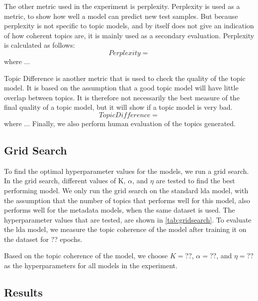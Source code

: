 The other metric used in the experiment is perplexity.
Perplexity is used as a metric, to show how well a model can predict new test samples.
But because perplexity is not specific to topic models, and by itself does not give an indication of how coherent topics are, it is mainly used as a secondary evaluation.
Perplexity is calculated as follows:
\begin{equation}
	Perplexity = 
\end{equation}
\noindent where ...

Topic Difference is another metric that is used to check the quality of the topic model.
It is based on the assumption that a good topic model will have little overlap between topics.
It is therefore not necessarily the best measure of the final quality of a topic model, but it will show if a topic model is very bad.
\begin{equation}
	Topic Difference = 
\end{equation}
\noindent where ...
Finally, we also perform human evaluation of the topics generated.

\subsection{Grid Search}\label{sec:experiment_gridsearch}
To find the optimal hyperparameter values for the models, we run a grid search.
In the grid search, different values of K, $\alpha$, and $\eta$ are tested to find the best performing model.
We only run the grid search on the standard \gls{lda} model, with the assumption that the number of topics that performs well for this model, also performs well for the metadata models, when the same dataset is used.
The hyperparameter values that are tested, are shown in \autoref{tab:gridsearch}.
To evaluate the \gls{lda} model, we measure the topic coherence of the model after training it on the dataset for ?? epochs.

Based on the topic coherence of the model, we choose $K = ??$, $\alpha = ??$, and $\eta = ??$ as the hyperparameters for all models in the experiment.



\subsection{Results}\label{sec:results}


